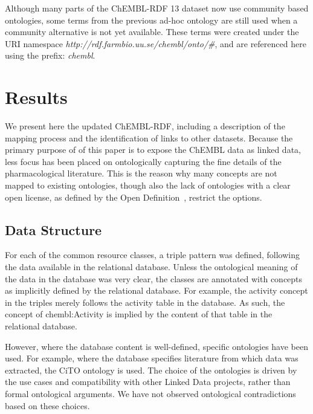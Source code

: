 \documentclass[10pt]{bmc_article}
\newenvironment{bmcformat}{\begin{raggedright}\baselineskip20pt\sloppy\setboolean{publ}{false}}{\end{raggedright}\baselineskip20pt\sloppy}
\begin{document}
\begin{bmcformat}
Although many parts of the ChEMBL-RDF 13 dataset now use community based ontologies, some 
terms from the previous ad-hoc ontology are still used when a community alternative is not yet available. 
These terms were created under the 
URI namespace \textit{http://rdf.farmbio.uu.se/chembl/onto/\#}, and are referenced here using the
prefix: \textit{chembl}.


\section*{Results}
\label{s3}

We present here the updated ChEMBL-RDF, including a description of the mapping process 
and the identification of links to other datasets. Because the primary purpose of of this
paper is to expose the ChEMBL data as linked data, less focus has been placed on ontologically
capturing the fine details of the pharmacological literature. This is the reason why
many concepts are not mapped to existing ontologies, though also the lack of ontologies
with a clear open license, as defined by the Open Definition~\cite{OpenDefinition}, restrict the options.

\subsection*{Data Structure}

For each of the common resource classes, a triple pattern was defined, following the
data available in the relational database. Unless the ontological meaning of the data
in the database was very clear, the classes are annotated with concepts as implicitly
defined by the relational database. For example, the activity concept in the triples
merely follows the activity table in the database. As such, the concept of chembl:Activity
is implied by the content of that table in the relational database.

However, where the database content is well-defined, specific ontologies have been used.
For example, where the database specifies literature from which data was extracted,
the CiTO ontology is used. The choice of the ontologies is driven by the use cases and
compatibility with other Linked Data projects, rather than formal ontological arguments.
We have not observed ontological contradictions based on these choices.


\end{bmcformat}
\end{document}
